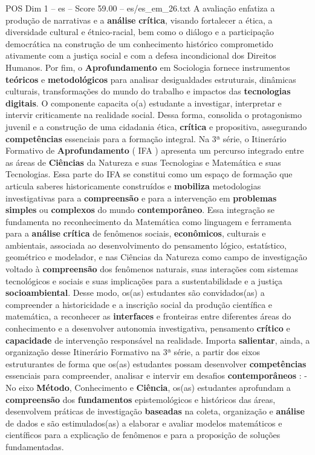 \begin{textsample}{POS Dim 1 – es – Score 59.00 – es/es\_em\_26.txt}
A avaliação enfatiza a produção de narrativas e a \textbf{análise} \textbf{crítica}, visando fortalecer a ética, a diversidade cultural e étnico-racial, bem como o diálogo e a participação democrática na construção de um conhecimento histórico comprometido ativamente com a justiça social e com a defesa incondicional dos Direitos Humanos.
Por fim, o \textbf{Aprofundamento} em Sociologia fornece instrumentos \textbf{teóricos} e \textbf{metodológicos} para analisar desigualdades estruturais, dinâmicas culturais, transformações do mundo do trabalho e impactos das \textbf{tecnologias} \textbf{digitais}.
O componente capacita o(a) estudante a investigar, interpretar e intervir criticamente na realidade social.
Dessa forma, consolida o protagonismo juvenil e a construção de uma cidadania ética, \textbf{crítica} e propositiva, assegurando \textbf{competências} essenciais para a formação integral.
Na 3ª série, o Itinerário Formativo de \textbf{Aprofundamento} ( IFA ) apresenta um percurso integrado entre as áreas de \textbf{Ciências} da Natureza e suas Tecnologias e Matemática e suas Tecnologias.
Essa parte do IFA se constitui como um espaço de formação que articula saberes historicamente construídos e \textbf{mobiliza} metodologias investigativas para a \textbf{compreensão} e para a intervenção em \textbf{problemas} \textbf{simples} ou \textbf{complexos} do mundo \textbf{contemporâneo}.
Essa integração se fundamenta no reconhecimento da Matemática como linguagem e ferramenta para a \textbf{análise} \textbf{crítica} de fenômenos sociais, \textbf{econômicos}, culturais e ambientais, associada ao desenvolvimento do pensamento lógico, estatístico, geométrico e modelador, e nas Ciências da Natureza como campo de investigação voltado à \textbf{compreensão} dos fenômenos naturais, suas interações com sistemas tecnológicos e sociais e suas implicações para a sustentabilidade e a justiça \textbf{socioambiental}.
Desse modo, os(as) estudantes são convidados(as) a compreender a historicidade e a inscrição social da produção científica e matemática, a reconhecer as \textbf{interfaces} e fronteiras entre diferentes áreas do conhecimento e a desenvolver autonomia investigativa, pensamento \textbf{crítico} e \textbf{capacidade} de intervenção responsável na realidade.
Importa \textbf{salientar}, ainda, a organização desse Itinerário Formativo na 3ª série, a partir dos eixos estruturantes de forma que os(as) estudantes possam desenvolver \textbf{competências} essenciais para compreender, analisar e intervir em desafios \textbf{contemporâneos} : - No eixo \textbf{Método}, Conhecimento e \textbf{Ciência}, os(as) estudantes aprofundam a \textbf{compreensão} dos \textbf{fundamentos} epistemológicos e históricos das áreas, desenvolvem práticas de investigação \textbf{baseadas} na coleta, organização e \textbf{análise} de dados e são estimulados(as) a elaborar e avaliar modelos matemáticos e científicos para a explicação de fenômenos e para a proposição de soluções fundamentadas.

\end{textsample}
